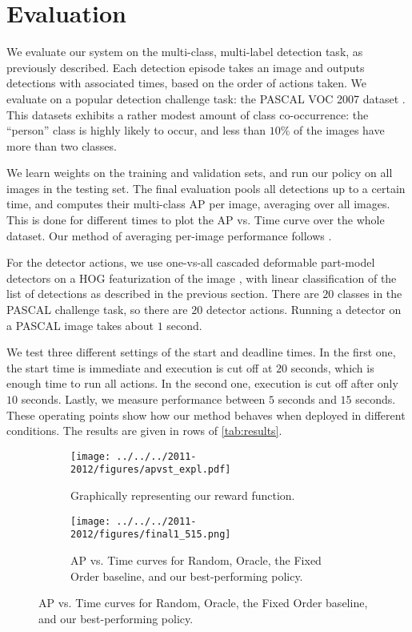 \section{Evaluation}\label{sec:det_evaluation}

We evaluate our system on the multi-class, multi-label detection task, as previously described.
Each detection episode takes an image and outputs detections with associated times, based on the order of actions taken.
We evaluate on a popular detection challenge task: the PASCAL VOC 2007 dataset \cite{pascal-voc-2010}.
This datasets exhibits a rather modest amount of class co-occurrence: the ``person'' class is highly likely to occur, and less than $10\%$ of the images have more than two classes.

We learn weights on the training and validation sets, and run our policy on all images in the testing set.
The final evaluation pools all detections up to a certain time, and computes their multi-class AP per image, averaging over all images.
This is done for different times to plot the AP vs. Time curve over the whole dataset.
Our method of averaging per-image performance follows \cite{Desai2009}.

For the detector actions, we use one-vs-all cascaded deformable part-model detectors on a HOG featurization of the image \cite{Felzenszwalb-CVPR-2010}, with linear classification of the list of detections as described in the previous section.
There are $20$ classes in the PASCAL challenge task, so there are $20$ detector actions.
Running a detector on a PASCAL image takes about $1$ second.

We test three different settings of the start and deadline times.
In the first one, the start time is immediate and execution is cut off at $20$ seconds, which is enough time to run all actions.
In the second one, execution is cut off after only $10$ seconds.
Lastly, we measure performance between $5$ seconds and $15$ seconds.
These operating points show how our method behaves when deployed in different conditions.
The results are given in rows of \autoref{tab:results}.

\begin{figure}[h!]
\centering
\begin{subfigure}[b]{.48\linewidth}
\texttt{[image: ../../../2011-2012/figures/apvst\_expl.pdf]}
\caption{
Graphically representing our reward function.
}\label{fig:det_rewards}
\end{subfigure}
\begin{subfigure}[b]{.48\linewidth}
\texttt{[image: ../../../2011-2012/figures/final1\_515.png]}
\caption{
AP vs. Time curves for Random, Oracle, the Fixed Order baseline, and our best-performing policy.
}\label{fig:results1}
\end{subfigure}
\end{figure}

